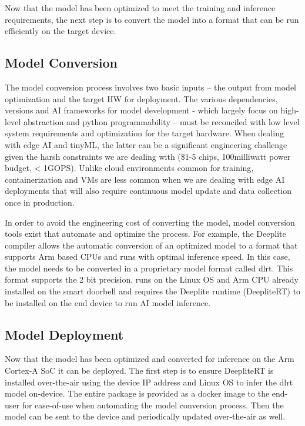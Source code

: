 {{{{{    Now that the model has been optimized to meet the training and inference requirements, the next step is to convert the model into a format that can be run efficiently on the target device.
    
    \subsection{Model Conversion}
    
    The model conversion process involves two basic inputs – the output from model optimization and the target HW for deployment. The various dependencies, versions and AI frameworks for model development - which largely focus on high-level abstraction and python programmability – must be reconciled with low level system requirements and optimization for the target hardware. When dealing with edge AI and tinyML, the latter can be a significant engineering challenge given the harsh constraints we are dealing with (\$1-5 chips, 100milliwatt power budget, < 1GOPS). Unlike cloud environments common for training, containerization and VMs are less common when we are dealing with edge AI deployments that will also require continuous model update and data collection once in production.
    
    In order to avoid the engineering cost of converting the model, model conversion tools exist that automate and optimize the process. For example, the Deeplite compiler allows the automatic conversion of an optimized model to a format that supports Arm based CPUs and runs with optimal inference speed. In this case, the model needs to be converted in a proprietary model format called dlrt. This format supports the 2 bit precision, runs on the Linux OS and Arm CPU already installed on the smart doorbell and requires the Deeplite runtime (DeepliteRT) to be installed on the end device to run AI model inference.
    
    \subsection{Model Deployment}
    
    Now that the model has been optimized and converted for inference on the Arm Cortex-A SoC it can be deployed. The first step is to ensure DeepliteRT is installed over-the-air using the device IP address and Linux OS to infer the dlrt model on-device. The entire package is provided as a docker image to the end-user for ease-of-use when automating the model conversion process. Then the model can be sent to the device and periodically updated over-the-air as well.
    
}}}}}
